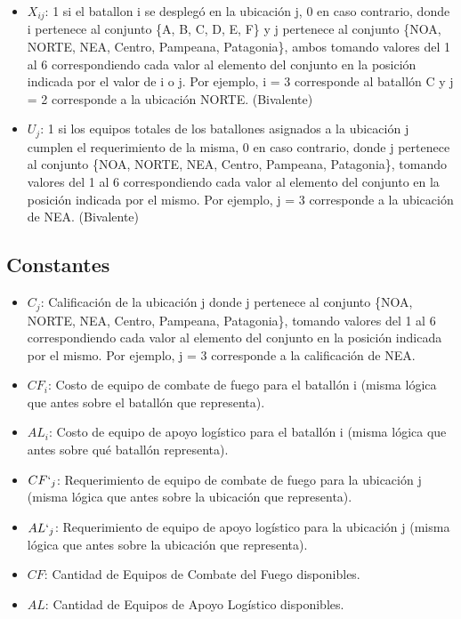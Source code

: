 \documentclass[12pt]{article}
\begin{document}
\begin{itemize}
    \item $X_{ij}$: 1 si el batallon i se desplegó en la ubicación j, 0 en caso contrario, donde i pertenece al conjunto \{A, B, C, D, E, F\} y j pertenece al conjunto \{NOA, NORTE, NEA, Centro, Pampeana, Patagonia\}, ambos tomando valores del 1 al 6 correspondiendo cada valor al elemento del conjunto en la posición indicada por el valor de i o j. Por ejemplo, i = 3 corresponde al batallón C y j = 2 corresponde a la ubicación NORTE. (Bivalente)
    \item $U_{j}$: 1 si los equipos totales de los batallones asignados a la ubicación j cumplen el requerimiento de la misma, 0 en caso contrario, donde j pertenece al conjunto \{NOA, NORTE, NEA, Centro, Pampeana, Patagonia\}, tomando valores del 1 al 6 correspondiendo cada valor al elemento del conjunto en la posición indicada por el mismo. Por ejemplo, j = 3 corresponde a la ubicación de NEA. (Bivalente)
\end{itemize}

\subsection{Constantes}

\begin{itemize}
    \item \textbf{$C_{j}$}: Calificación de la ubicación j donde j pertenece al conjunto \{NOA, NORTE, NEA, Centro, Pampeana, Patagonia\}, tomando valores del 1 al 6 correspondiendo cada valor al elemento del conjunto en la posición indicada por el mismo. Por ejemplo, j = 3 corresponde a la calificación de NEA.
    \item \textbf{$CF_{i}$}: Costo de equipo de combate de fuego para el batallón i (misma lógica que antes sobre el batallón que representa).
    \item \textbf{$AL_{i}$}: Costo de equipo de apoyo logístico para el batallón i (misma lógica que antes sobre qué batallón representa).
    \item \textbf{$CF`_{j}$}: Requerimiento de equipo de combate de fuego para la ubicación j (misma lógica que antes sobre la ubicación que representa).
    \item \textbf{$AL`_{j}$}: Requerimiento de equipo de apoyo logístico para la ubicación j (misma lógica que antes sobre la ubicación que representa).
    \item \textbf{$CF$}: Cantidad de Equipos de Combate del Fuego disponibles.
    \item \textbf{$AL$}: Cantidad de Equipos de Apoyo Logístico disponibles.
\end{itemize}
\end{document}
